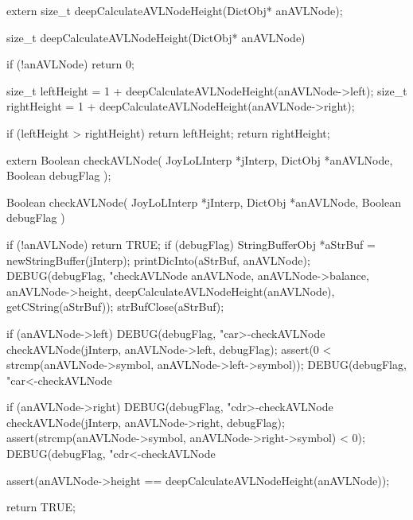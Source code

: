 \startCHeader
extern size_t deepCalculateAVLNodeHeight(DictObj* anAVLNode);
\stopCHeader

\startCCode
size_t deepCalculateAVLNodeHeight(DictObj* anAVLNode) {
  if (!anAVLNode) return 0;

  size_t leftHeight = 1 + deepCalculateAVLNodeHeight(anAVLNode->left);
  size_t rightHeight = 1 + deepCalculateAVLNodeHeight(anAVLNode->right);

  if (leftHeight > rightHeight) return leftHeight;
  return rightHeight;
}
\stopCCode

\startCHeader
extern Boolean checkAVLNode(
  JoyLoLInterp *jInterp,
  DictObj      *anAVLNode,
  Boolean       debugFlag
);
\stopCHeader

\startCCode
Boolean checkAVLNode(
  JoyLoLInterp *jInterp,
  DictObj      *anAVLNode, 
  Boolean       debugFlag
) {
  if (!anAVLNode) return TRUE;
  if (debugFlag) {
    StringBufferObj *aStrBuf = 
      newStringBuffer(jInterp);
    printDicInto(aStrBuf, anAVLNode);
    DEBUG(debugFlag, "checkAVLNode %
          anAVLNode, anAVLNode->balance, anAVLNode->height,
          deepCalculateAVLNodeHeight(anAVLNode),
          getCString(aStrBuf));
    strBufClose(aStrBuf);
  }

  if (anAVLNode->left) {
      DEBUG(debugFlag, "car>-checkAVLNode %
      checkAVLNode(jInterp, anAVLNode->left, debugFlag);
      assert(0 < strcmp(anAVLNode->symbol,
                      anAVLNode->left->symbol));
    DEBUG(debugFlag, "car<-checkAVLNode %
  }

  if (anAVLNode->right) {
    DEBUG(debugFlag, "cdr>-checkAVLNode %
    checkAVLNode(jInterp, anAVLNode->right, debugFlag);
    assert(strcmp(anAVLNode->symbol,
                  anAVLNode->right->symbol) < 0);
    DEBUG(debugFlag, "cdr<-checkAVLNode %
  }

  assert(anAVLNode->height == deepCalculateAVLNodeHeight(anAVLNode));

  return TRUE;
}
\stopCCode

